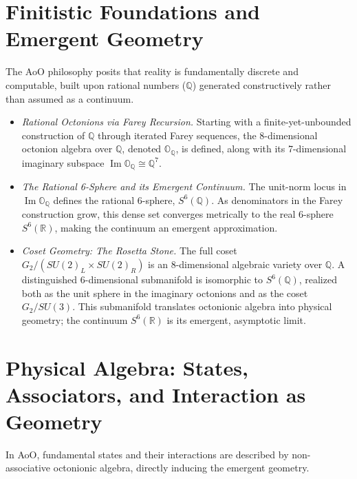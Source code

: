 \documentclass[12pt]{article}
\begin{document}
\section{Finitistic Foundations and Emergent Geometry}

The AoO philosophy posits that reality is fundamentally discrete and computable, built upon rational numbers (\(\mathbb{Q}\)) generated constructively rather than assumed as a continuum.

\begin{itemize}
    \item \emph{Rational Octonions via Farey Recursion.} Starting with a finite-yet-unbounded construction of \(\mathbb{Q}\) through iterated Farey sequences, the 8-dimensional octonion algebra over \(\mathbb{Q}\), denoted \(\mathbb{O}_{\mathbb{Q}}\), is defined, along with its 7-dimensional imaginary subspace \(\operatorname{Im}\mathbb{O}_{\mathbb{Q}} \cong \mathbb{Q}^7\).
    \item \emph{The Rational 6-Sphere and its Emergent Continuum.} The unit-norm locus in \(\operatorname{Im}\mathbb{O}_{\mathbb{Q}}\) defines the rational 6-sphere, \(S^6(\mathbb{Q})\). As denominators in the Farey construction grow, this dense set converges metrically to the real 6-sphere \(S^6(\mathbb{R})\), making the continuum an emergent approximation.
    \item \emph{Coset Geometry: The Rosetta Stone.} The full coset \(G_2/(SU(2)_L \times SU(2)_R)\) is an 8-dimensional algebraic variety over \(\mathbb{Q}\). A distinguished 6-dimensional submanifold is isomorphic to \(S^6(\mathbb{Q})\), realized both as the unit sphere in the imaginary octonions and as the coset \(G_2/SU(3)\). This submanifold translates octonionic algebra into physical geometry; the continuum \(S^6(\mathbb{R})\) is its emergent, asymptotic limit.
\end{itemize}

\section{Physical Algebra: States, Associators, and Interaction as Geometry}

In AoO, fundamental states and their interactions are described by non-associative octonionic algebra, directly inducing the emergent geometry.
\end{document}

